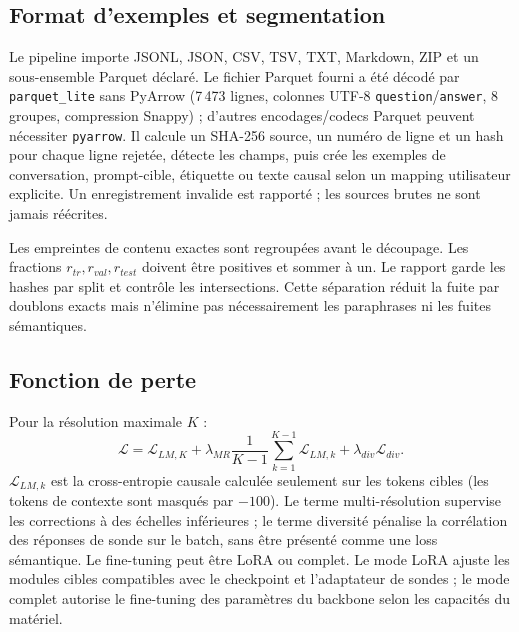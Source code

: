 \documentclass[11pt,a4paper]{article}
\begin{document}
\subsection{Format d'exemples et segmentation}
Le pipeline importe JSONL, JSON, CSV, TSV, TXT, Markdown, ZIP et un sous-ensemble Parquet déclaré. Le fichier Parquet fourni a été décodé par \texttt{parquet\_lite} sans PyArrow (7\,473 lignes, colonnes UTF-8 \texttt{question}/\texttt{answer}, 8 groupes, compression Snappy) ; d'autres encodages/codecs Parquet peuvent nécessiter \texttt{pyarrow}. Il calcule un SHA-256 source, un numéro de ligne et un hash pour chaque ligne rejetée, détecte les champs, puis crée les exemples de conversation, prompt-cible, étiquette ou texte causal selon un mapping utilisateur explicite. Un enregistrement invalide est rapporté ; les sources brutes ne sont jamais réécrites.

Les empreintes de contenu exactes sont regroupées avant le découpage. Les fractions \(r_{tr},r_{val},r_{test}\) doivent être positives et sommer à un. Le rapport garde les hashes par split et contrôle les intersections. Cette séparation réduit la fuite par doublons exacts mais n'élimine pas nécessairement les paraphrases ni les fuites sémantiques.

\subsection{Fonction de perte}
Pour la résolution maximale \(K\) :
\[
\mathcal L=\mathcal L_{LM,K}+\lambda_{MR}\frac1{K-1}\sum_{k=1}^{K-1}\mathcal L_{LM,k}+\lambda_{div}\mathcal L_{div}.
\]
\(\mathcal L_{LM,k}\) est la cross-entropie causale calculée seulement sur les tokens cibles (les tokens de contexte sont masqués par \(-100\)). Le terme multi-résolution supervise les corrections à des échelles inférieures ; le terme diversité pénalise la corrélation des réponses de sonde sur le batch, sans être présenté comme une loss sémantique. Le fine-tuning peut être LoRA ou complet. Le mode LoRA ajuste les modules cibles compatibles avec le checkpoint et l'adaptateur de sondes ; le mode complet autorise le fine-tuning des paramètres du backbone selon les capacités du matériel.
\end{document}
